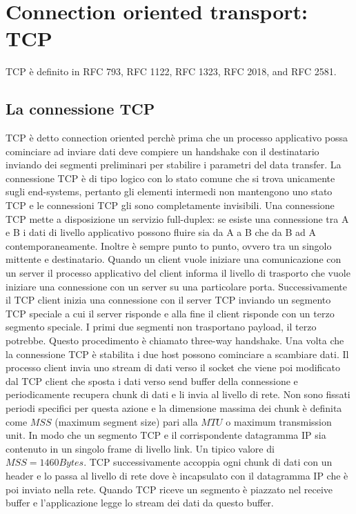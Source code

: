 \section{Connection oriented transport: TCP}
TCP \`e definito in RFC 793, RFC 1122, RFC 1323, RFC 2018, and RFC 2581.
\subsection{La connessione TCP}
TCP \`e detto connection oriented perch\`e prima che un processo applicativo possa cominciare ad inviare dati deve compiere un handshake con il 
destinatario inviando dei segmenti preliminari per stabilire i parametri del data transfer. La connessione TCP \`e di tipo logico con lo stato comune 
che si trova unicamente sugli end-systems, pertanto gli elementi intermedi non mantengono uno stato TCP e le connessioni TCP gli sono completamente 
invisibili. Una connessione TCP mette a disposizione un servizio full-duplex: se esiste una connessione tra A e B i dati di livello applicativo possono
fluire sia da A a B che da B ad A contemporaneamente. Inoltre \`e sempre punto to punto, ovvero tra un singolo mittente e destinatario. Quando un client 
vuole iniziare una comunicazione con un server il processo applicativo del client informa il livello di trasporto che vuole iniziare una connessione con un
server su una particolare porta. Successivamente il TCP client inizia una connessione con il server TCP inviando un segmento TCP speciale a cui il server
risponde e alla fine il client risponde con un terzo segmento speciale. I primi due segmenti non trasportano payload, il terzo potrebbe. Questo procedimento
\`e chiamato three-way handshake. Una volta che la connessione TCP \`e stabilita i due host possono cominciare a scambiare dati. Il processo client invia 
uno stream di dati verso il socket che viene poi modificato dal TCP client che sposta i dati verso send buffer della connessione e periodicamente recupera
chunk di dati e li invia al livello di rete. Non sono fissati periodi specifici per questa azione e la dimensione massima dei chunk \`e definita come $MSS$
(maximum segment size) pari alla $MTU$ o maximum transmission unit. In modo che un segmento TCP e il corrispondente datagramma IP sia contenuto in un 
singolo frame di livello link. Un tipico valore di $MSS=1460Bytes$. TCP successivamente accoppia ogni chunk di dati con un header e lo passa al livello di 
rete dove \`e incapsulato con il datagramma IP che \`e poi inviato nella rete. Quando TCP riceve un segmento \`e piazzato nel receive buffer e 
l'applicazione legge lo stream dei dati da questo buffer. 
